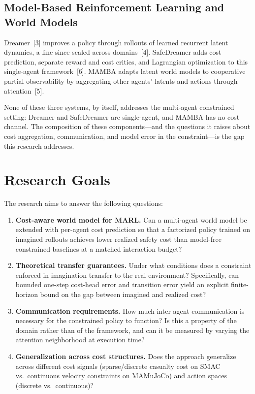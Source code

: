 \documentclass[12pt,a4paper]{article}
\begin{document}
\subsection{Model-Based Reinforcement Learning and World Models}

Dreamer~[3] improves a policy through rollouts of learned recurrent latent dynamics, a line since scaled across domains~[4].
SafeDreamer adds cost prediction, separate reward and cost critics, and Lagrangian optimization to this single-agent framework~[6].
MAMBA adapts latent world models to cooperative partial observability by aggregating other agents' latents and actions through attention~[5].

None of these three systems, by itself, addresses the multi-agent constrained setting: Dreamer and SafeDreamer are single-agent, and MAMBA has no cost channel.
The composition of these components---and the questions it raises about cost aggregation, communication, and model error in the constraint---is the gap this research addresses.

\section{Research Goals}

The research aims to answer the following questions:

\begin{enumerate}[leftmargin=1.5em]
    \item \textbf{Cost-aware world model for MARL.} Can a multi-agent world model be extended with per-agent cost prediction so that a factorized policy trained on imagined rollouts achieves lower realized safety cost than model-free constrained baselines at a matched interaction budget?

    \item \textbf{Theoretical transfer guarantees.} Under what conditions does a constraint enforced in imagination transfer to the real environment? Specifically, can bounded one-step cost-head error and transition error yield an explicit finite-horizon bound on the gap between imagined and realized cost?

    \item \textbf{Communication requirements.} How much inter-agent communication is necessary for the constrained policy to function? Is this a property of the domain rather than of the framework, and can it be measured by varying the attention neighborhood at execution time?

    \item \textbf{Generalization across cost structures.} Does the approach generalize across different cost signals (sparse/discrete casualty cost on SMAC vs.\ continuous velocity constraints on MAMuJoCo) and action spaces (discrete vs.\ continuous)?
\end{enumerate}
\end{document}
